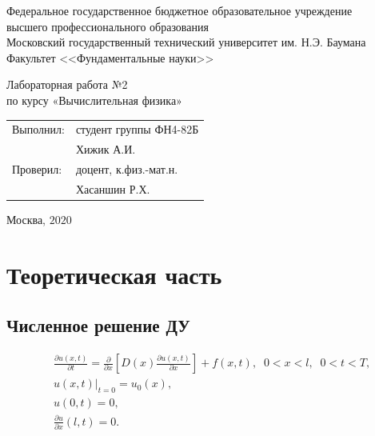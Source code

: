 \documentclass[
11pt,
master, %
subf, %
href, %
colorlinks=true, %
]{disser}
\newcommand*{\PartDif}[2]{\frac{\partial #1}{\partial #2}}
\newcommand*{\PartD}[1]{\frac{\partial}{\partial #1}}
\newcommand*{\SR}[1]{\left[ #1 \right]}
\begin{document}
	\pagestyle{empty}
	\begin{center}
		
		\noindent  Федеральное государственное бюджетное образовательное учреждение\\
		высшего профессионального образования\\
		
		Московский государственный технический университет им. Н.Э. Баумана \\
		Факультет <<Фундаментальные науки>>\bigskip\\
		
		\vfill
		
		Лабораторная работа №2\\
		по курсу «Вычислительная физика»\\
		
		
		\vfill
		\vfill
		\begin{flushright}
			\begin{tabular}{ll}
				Выполнил: & студент группы ФН4-82Б     \\
				& Хижик А.И. \\
				Проверил:  & доцент, к.физ.-мат.н.       \\
				& Хасаншин Р.Х.
			\end{tabular}
		\end{flushright}
		\vfill
		\begin{center}
			Москва, $2020$
		\end{center}
		
	\end{center}
	\pagebreak
	
	
	\pagestyle{plain}
	\tableofcontents

\section{Теоретическая часть}
\subsection*{Численное решение ДУ}
\begin{align}
        &\PartDif{u(x,t)}{t} = \PartD{x}\SR{D(x)\PartDif{u(x,t)}{x}} + f(x,t), \;\; 0 < x  < l, \;\; 0 < t < T, \label{eq:5}\\
        &u(x,t)\bigg|_{t = 0} = u_0(x), \label{eq:6}\\
        &u(0,t) = 0, \label{eq:7}\\
        &\PartDif{u}{x}(l,t) = 0. \label{eq:8}
\end{align}
\end{document}
